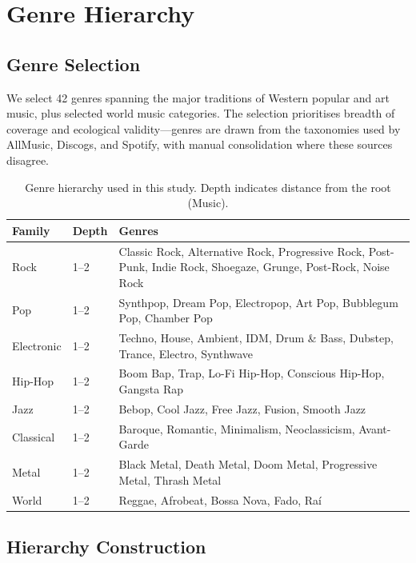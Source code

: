 \documentclass[12pt,a4paper]{article}
\begin{document}
\section{Genre Hierarchy}
\label{sec:hierarchy}

\subsection{Genre Selection}

We select 42 genres spanning the major traditions of Western popular and art music, plus selected world music categories. The selection prioritises breadth of coverage and ecological validity---genres are drawn from the taxonomies used by AllMusic, Discogs, and Spotify, with manual consolidation where these sources disagree.

\begin{table}[htbp]
\centering
\caption{Genre hierarchy used in this study. Depth indicates distance from the root (Music).}
\label{tab:genres}
\small
\begin{tabular}{llp{7.5cm}}
\toprule
\textbf{Family} & \textbf{Depth} & \textbf{Genres} \\
\midrule
Rock      & 1--2 & Classic Rock, Alternative Rock, Progressive Rock, Post-Punk, Indie Rock, Shoegaze, Grunge, Post-Rock, Noise Rock \\
Pop       & 1--2 & Synthpop, Dream Pop, Electropop, Art Pop, Bubblegum Pop, Chamber Pop \\
Electronic& 1--2 & Techno, House, Ambient, IDM, Drum \& Bass, Dubstep, Trance, Electro, Synthwave \\
Hip-Hop   & 1--2 & Boom Bap, Trap, Lo-Fi Hip-Hop, Conscious Hip-Hop, Gangsta Rap \\
Jazz      & 1--2 & Bebop, Cool Jazz, Free Jazz, Fusion, Smooth Jazz \\
Classical & 1--2 & Baroque, Romantic, Minimalism, Neoclassicism, Avant-Garde \\
Metal     & 1--2 & Black Metal, Death Metal, Doom Metal, Progressive Metal, Thrash Metal \\
World     & 1--2 & Reggae, Afrobeat, Bossa Nova, Fado, Ra\'i \\
\bottomrule
\end{tabular}
\end{table}

\subsection{Hierarchy Construction}
\end{document}
